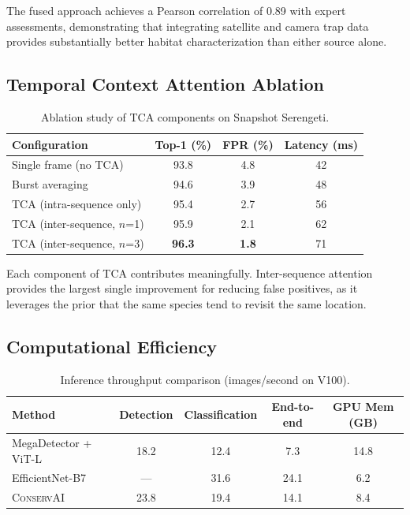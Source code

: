 \documentclass[11pt,letterpaper]{article}
\newcommand{\ConservAI}{\textsc{ConservAI}}
\begin{document}
The fused approach achieves a Pearson correlation of 0.89 with expert assessments, demonstrating that integrating satellite and camera trap data provides substantially better habitat characterization than either source alone.

\subsection{Temporal Context Attention Ablation}

\begin{table}[htbp]
\centering
\caption{Ablation study of TCA components on Snapshot Serengeti.}
\label{tab:tca_ablation}
\begin{tabular}{lccc}
\toprule
\textbf{Configuration} & \textbf{Top-1 (\%)} & \textbf{FPR (\%)} & \textbf{Latency (ms)} \\
\midrule
Single frame (no TCA) & 93.8 & 4.8 & 42 \\
Burst averaging & 94.6 & 3.9 & 48 \\
TCA (intra-sequence only) & 95.4 & 2.7 & 56 \\
TCA (inter-sequence, $n$=1) & 95.9 & 2.1 & 62 \\
TCA (inter-sequence, $n$=3) & \textbf{96.3} & \textbf{1.8} & 71 \\
\bottomrule
\end{tabular}
\end{table}

Each component of TCA contributes meaningfully. Inter-sequence attention provides the largest single improvement for reducing false positives, as it leverages the prior that the same species tend to revisit the same location.

\subsection{Computational Efficiency}

\begin{table}[htbp]
\centering
\caption{Inference throughput comparison (images/second on V100).}
\label{tab:efficiency}
\begin{tabular}{lcccc}
\toprule
\textbf{Method} & \textbf{Detection} & \textbf{Classification} & \textbf{End-to-end} & \textbf{GPU Mem (GB)} \\
\midrule
MegaDetector + ViT-L & 18.2 & 12.4 & 7.3 & 14.8 \\
EfficientNet-B7 & --- & 31.6 & 24.1 & 6.2 \\
\ConservAI{} & 23.8 & 19.4 & 14.1 & 8.4 \\
\bottomrule
\end{tabular}
\end{table}
\end{document}
